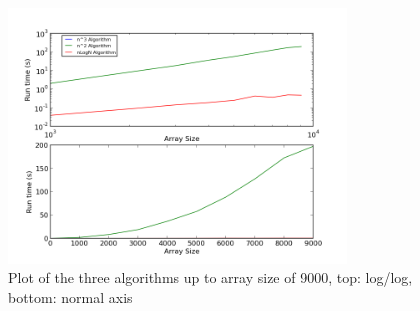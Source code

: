 \documentclass[a4paper,12pt]{article}
\begin{document}
\begin{figure}[h!]
\centering
\includegraphics[width=0.8\textwidth]{plotTo9000}
\caption{Plot of the three algorithms up to array size of 9000, top: log/log, bottom: normal axis}
\end{figure} 
\end{document}
